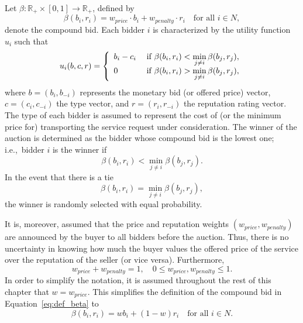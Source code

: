 Let $\beta : \mathbb{R}_+\times [0,1] \to \mathbb{R}_+$, defined by
\begin{equation}
	\label{eq:def_beta}
	\beta(b_i, r_i) = w_{price}\cdot b_i + w_{penalty}\cdot r_i \quad\text{for all } i\in N,
\end{equation}
denote the compound bid. Each bidder $i$ is characterized by the utility function $u_i$ such that
\begin{equation}
	\label{eq:sellers_utility}
	u_i(b,c,r) = \left\{
	\begin{array}{l l}
		b_i-c_i & \;\text{if } \beta(b_i, r_i) < \displaystyle\min_{j\neq i}\beta(b_j,r_j),\\
		0 & \;\text{if } \beta(b_i, r_i) > \displaystyle\min_{j\neq i}\beta(b_j,r_j),
	\end{array}\right.
\end{equation}
where $b = (b_i,b_{-i})$ represents the monetary bid (or offered price) vector, $c = (c_i, c_{-i})$ the type vector, and $r = (r_i, r_{-i})$ the reputation rating vector. The type of each bidder is assumed to represent the cost of (or the minimum price for) transporting the service request under consideration. The winner of the auction is determined as the bidder whose compound bid is the lowest one; i.e.,~bidder $i$ is the winner if
\begin{equation*}
	\beta(b_i, r_i) < \displaystyle\min_{j\neq i}\beta(b_j,r_j).
\end{equation*}
In the event that there is a tie
\begin{equation*}
	\beta(b_i, r_i) = \displaystyle\min_{j\neq i}\beta(b_j,r_j),
\end{equation*}
the winner is randomly selected with equal probability.

It is, moreover, assumed that the price and reputation weights $(w_{price}, w_{penalty})$ are announced by the buyer to all bidders before the auction. Thus, there is no uncertainty in knowing how much the buyer values the offered price of the service over the reputation of the seller (or vice versa). Furthermore,
\begin{equation*}
	w_{price} + w_{penalty} = 1,\quad 0\le w_{price},w_{penalty} \le 1.
\end{equation*}
In order to simplify the notation, it is assumed throughout the rest of this chapter that $w=w_{price}$. This simplifies the definition of the compound bid in Equation~\eqref{eq:def_beta} to
\begin{equation*}
  \beta(b_i, r_i) = wb_i + (1-w)r_i\quad\text{for all } i\in N.
\end{equation*}
	
